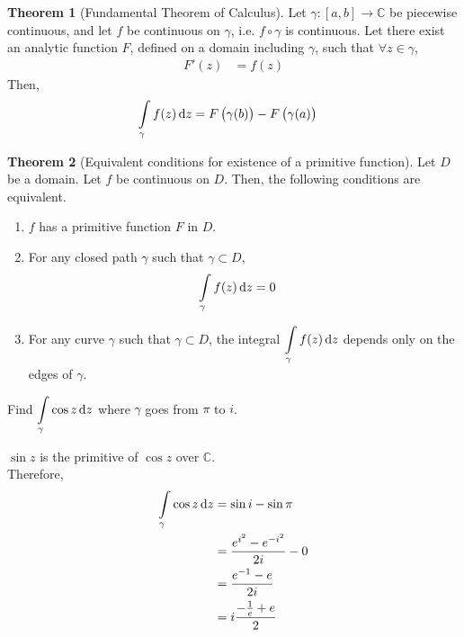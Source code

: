 \documentclass[titlepage, fleqn, a4paper, 12pt, twoside]{article}
\theoremstyle{definition}
\theoremstyle{theorem}
\newtheorem{theorem}{Theorem}
\begin{document}
\begin{theorem}[Fundamental Theorem of Calculus]
	Let $\gamma : [a,b] \to \mathbb{C}$ be piecewise continuous, and let $f$ be continuous on $\gamma$, i.e. $f \circ \gamma$ is continuous.
	Let there exist an analytic function $F$, defined on a domain including $\gamma$, such that $\forall z \in \gamma$,
	\begin{align*}
		F'(z) & = f(z)
	\end{align*}
	Then,
	\begin{align*}
		\int\limits_{\gamma} f(z) \dif z & = F\left( \gamma(b) \right) - F\left( \gamma(a) \right)
	\end{align*}
	\label{thm:Fundamental_Theorem_of_Calculus}
\end{theorem}

\begin{theorem}[Equivalent conditions for existence of a primitive function]
	Let $D$ be a domain.
	Let $f$ be continuous on $D$.
	Then, the following conditions are equivalent.
	\begin{enumerate}
		\item
			$f$ has a primitive function $F$ in $D$.
		\item
			For any closed path $\gamma$ such that $\gamma \subset D$,
			\begin{align*}
				\int\limits_{\gamma} f(z) \dif z &= 0
			\end{align*}
		\item
			For any curve $\gamma$ such that $\gamma \subset D$, the integral $\displaystyle \int\limits_{\gamma} f(z) \dif z$ depends only on the edges of $\gamma$.
	\end{enumerate}
	\label{Equivalent_conditions_for_existence_of_a_primitive_function}
\end{theorem}

\begin{question}
	Find $\displaystyle \int\limits_{\gamma} \cos z \dif z$ where $\gamma$ goes from $\pi$ to $i$.
\end{question}

\begin{solution}
	$\sin z$ is the primitive of $\cos z$ over $\mathbb{C}$.\\
	Therefore,
	\begin{align*}
		\int\limits_{\gamma} \cos z \dif z & = \sin i - \sin \pi                  \\
                                                   & = \frac{e^{i^2} - e^{-i^2}}{2 i} - 0 \\
                                                   & = \frac{e^{-1} - e}{2 i}             \\
                                                   & = i \frac{-\frac{1}{e} + e}{2}
	\end{align*}
\end{solution}
\end{document}
